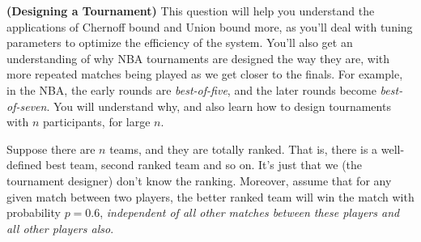 \documentclass[solution,addpoints,12pt]{exam}
\begin{document}
\begin{questions}



\question[15] \textbf{(Designing a Tournament)}  This question will help you understand the applications of Chernoff bound and Union bound more, as you'll deal with tuning parameters to optimize the efficiency of the system. You'll also get an understanding of why NBA tournaments are designed the way they are, with more repeated matches being played as we get closer to the finals. For example, in the NBA, the early rounds are \emph{best-of-five}, and the later rounds become \emph{best-of-seven}. You will understand why, and also learn how to design tournaments with $n$ participants, for large $n$.

Suppose there are $n$ teams, and they are totally ranked. That is, there is a well-defined best team, second ranked team and so on. It's just that we (the tournament designer) don't know the ranking. Moreover, assume that for any given match between two players, the better ranked team will win the match with probability $p = 0.6$, \emph{independent of all other matches between these players and all other players also}. 

\end{questions}
\end{document}
